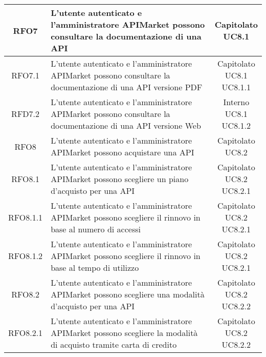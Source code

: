 \begin{longtable}{|c|m{8cm}|c|}
RFO7 & L'utente autenticato e l'amministratore APIMarket possono consultare la documentazione di una API & \makecell*{Capitolato\\UC8.1} \\
\hline

RFO7.1 & L'utente autenticato e l'amministratore APIMarket possono consultare la documentazione di una API versione PDF & \makecell*{Capitolato\\UC8.1\\UC8.1.1} \\
\hline
RFD7.2 & L'utente autenticato e l'amministratore APIMarket possono consultare la documentazione di una API versione Web & \makecell*{Interno\\UC8.1\\UC8.1.2} \\
\hline

RFO8 & L'utente autenticato e l'amministratore APIMarket possono acquistare una API & \makecell*{Capitolato\\UC8.2} \\
\hline

RFO8.1 & L'utente autenticato e l'amministratore APIMarket possono scegliere un piano d'acquisto per una API & \makecell*{Capitolato\\UC8.2\\UC8.2.1} \\
\hline

RFO8.1.1 & L'utente autenticato e l'amministratore APIMarket possono scegliere il rinnovo in base al numero di accessi & \makecell*{Capitolato\\UC8.2\\UC8.2.1} \\
\hline
RFO8.1.2 & L'utente autenticato e l'amministratore APIMarket possono scegliere il rinnovo in base al tempo di utilizzo & \makecell*{Capitolato\\UC8.2\\UC8.2.1} \\
\hline

RFO8.2 & L'utente autenticato e l'amministratore APIMarket possono scegliere una modalità d'acquisto per una API & \makecell*{Capitolato\\UC8.2\\UC8.2.2} \\
\hline

RFO8.2.1 & L'utente autenticato e l'amministratore APIMarket possono scegliere la modalità di acquisto tramite carta di credito & \makecell*{Capitolato\\UC8.2\\UC8.2.2} \\
\hline


\end{longtable}
